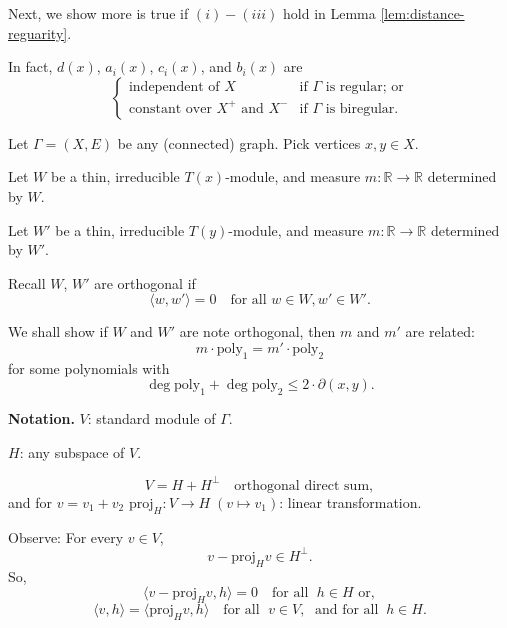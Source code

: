 \documentclass[
]{book}
\theoremstyle{definition}
\theoremstyle{definition}
\theoremstyle{definition}
\theoremstyle{definition}
\theoremstyle{remark}
\begin{document}
Next, we show more is true if \((i)-(iii)\) hold in Lemma \ref{lem:distance-reguarity}.

In fact, \(d(x)\), \(a_i(x)\), \(c_i(x)\), and \(b_i(x)\) are
\[\begin{cases} 
\text{independent of $X$} & \text{if $\Gamma$ is regular; or}\\
\text{constant over $X^+$ and $X^-$} & \text{if $\Gamma$ is biregular.}
\end{cases}\]

Let \(\Gamma = (X, E)\) be any (connected) graph. Pick vertices \(x, y\in X\).

Let \(W\) be a thin, irreducible \(T(x)\)-module, and
measure \(m: \mathbb{R} \to \mathbb{R}\) determined by \(W\).

Let \(W'\) be a thin, irreducible \(T(y)\)-module, and
measure \(m: \mathbb{R} \to \mathbb{R}\) determined by \(W'\).

Recall \(W\), \(W'\) are orthogonal if
\[\langle w, w'\rangle = 0 \quad \text{for all }w\in W, w'\in W'.\]

We shall show if \(W\) and \(W'\) are note orthogonal, then \(m\) and \(m'\) are related:
\[m\cdot \mathrm{poly}_1 = m'\cdot \mathrm{poly}_2\]
for some polynomials with
\[\deg \mathrm{poly}_1 + \deg \mathrm{poly}_2 \leq 2\cdot \partial(x,y).\]

\textbf{Notation.}
\(V\): standard module of \(\Gamma\).

\(H\): any subspace of \(V\).

\[V = H + H^\bot \quad \text{orthogonal direct sum},\]
and for \(v = v_1 + v_2\) \(\mathrm{proj}_H: V\to H \; (v\mapsto v_1)\): linear transformation.

Observe:
For every \(v\in V\),
\[v - \mathrm{proj}_H v \in H^\bot.\]
So,
\[\langle v - \mathrm{proj}_H v, h\rangle = 0 \quad \text{for all }\;h\in H \text{ or},\]
\[\langle v, h\rangle = \langle \mathrm{proj}_H v, h\rangle \quad \text{for all }\;v\in V, \;\text{ and for all }\: h\in H.\]
\end{document}
